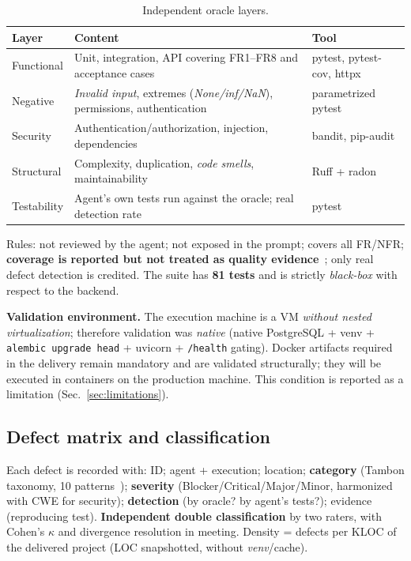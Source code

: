 \documentclass[11pt]{article}
\begin{document}
\begin{table}[htbp]
  \centering
  \caption{Independent oracle layers.}
  \label{tab:oracle}
  \begin{tabular}{lll}
    \toprule
    Layer & Content & Tool \\
    \midrule
    Functional & Unit, integration, API covering FR1--FR8 and acceptance cases & pytest, pytest-cov, httpx \\
    Negative & \emph{Invalid input}, extremes (\emph{None/inf/NaN}), permissions, authentication & parametrized pytest \\
    Security & Authentication/authorization, injection, dependencies & bandit, pip-audit \\
    Structural & Complexity, duplication, \emph{code smells}, maintainability & Ruff + radon \\
    Testability & Agent's own tests run against the oracle; real detection rate & pytest \\
    \bottomrule
  \end{tabular}
\end{table}

Rules: not reviewed by the agent; not exposed in the prompt; covers all FR/NFR; \textbf{coverage is reported but not treated as quality evidence}~\cite{C05}; only real defect detection is credited. The suite has \textbf{81 tests} and is strictly \emph{black-box} with respect to the backend.

\textbf{Validation environment.} The execution machine is a VM \emph{without nested virtualization}; therefore validation was \emph{native} (native PostgreSQL + venv + \texttt{alembic upgrade head} + uvicorn + \texttt{/health} gating). Docker artifacts required in the delivery remain mandatory and are validated structurally; they will be executed in containers on the production machine. This condition is reported as a limitation (Sec.~\ref{sec:limitations}).

\subsection{Defect matrix and classification}

Each defect is recorded with: ID; agent + execution; location; \textbf{category} (Tambon taxonomy, 10 patterns~\cite{B01}); \textbf{severity} (Blocker/Critical/Major/Minor, harmonized with CWE for security); \textbf{detection} (by oracle? by agent's tests?); evidence (reproducing test). \textbf{Independent double classification} by two raters, with Cohen's $\kappa$ and divergence resolution in meeting. Density = defects per KLOC of the delivered project (LOC snapshotted, without \emph{venv}/cache).
\end{document}
